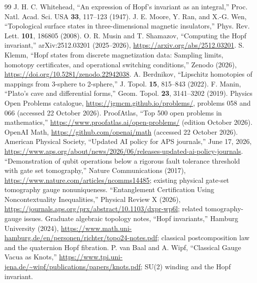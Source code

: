 \documentclass[aps,prd,onecolumn,notitlepage,11pt,superscriptaddress,longbibliography]{revtex4-2}
\begin{document}
\begin{thebibliography}{99}
 J. H. C. Whitehead, ``An expression of Hopf's invariant as an integral,'' Proc. Natl. Acad. Sci. USA \textbf{33}, 117--123 (1947).
 J. E. Moore, Y. Ran, and X.-G. Wen, ``Topological surface states in three-dimensional magnetic insulators,'' Phys. Rev. Lett. \textbf{101}, 186805 (2008).
 O. R. Musin and T. Shamazov, ``Computing the Hopf invariant,'' arXiv:2512.03201 (2025--2026), \url{https://arxiv.org/abs/2512.03201}.
 S. Klemm, ``Hopf states from discrete magnetization data: Sampling limits, homotopy certificates, and operational switching conditions,'' Zenodo (2026), \url{https://doi.org/10.5281/zenodo.22942038}.
 A. Berdnikov, ``Lipschitz homotopies of mappings from 3-sphere to 2-sphere,'' J. Topol. \textbf{15}, 815--843 (2022).
 F. Manin, ``Plato's cave and differential forms,'' Geom. Topol. \textbf{23}, 3141--3202 (2019).
 Physics Open Problems catalogue, \url{https://jgmcm.github.io/problems/}, problems 058 and 066 (accessed 22 October 2026).
 ProofAtlas, ``Top 500 open problems in mathematics,'' \url{https://www.proofatlas.ai/open-problems/} (edition October 2026).
 OpenAI Math, \url{https://github.com/openai/math} (accessed 22 October 2026).
 American Physical Society, ``Updated AI policy for APS journals,'' June 17, 2026, \url{https://www.aps.org/about/news/2026/06/releases-updated-ai-policy-journals}.
 ``Demonstration of qubit operations below a rigorous fault tolerance threshold with gate set tomography,'' Nature Communications (2017), \url{https://www.nature.com/articles/ncomms14485}; existing physical gate-set tomography gauge nonuniqueness.
 ``Entanglement Certification Using Noncontextuality Inequalities,'' Physical Review X (2026), \url{https://journals.aps.org/prx/abstract/10.1103/dxpr-wp6l}; related tomography-gauge issues.
 Graduate algebraic topology notes, ``Hopf invariants,'' Hamburg University (2024), \url{https://www.math.uni-hamburg.de/en/personen/richter/topo24-notes.pdf}; classical postcomposition law and the quaternion Hopf fibration.
 P. van Baal and A. Wipf, ``Classical Gauge Vacua as Knots,'' \url{https://www.tpi.uni-jena.de/~wipf/publications/papers/knots.pdf}; SU(2) winding and the Hopf invariant.

\end{thebibliography}
\end{document}

